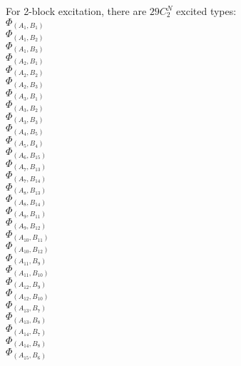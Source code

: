 \documentclass[14pt]{article}
\begin{document}
    For 2-block excitation, there are $ 29C^N_2 $ excited types: \\ 
    $\Phi_{({A}_{1}, {B}_{1})}$ \\ 
    $\Phi_{({A}_{1}, {B}_{2})}$ \\ 
    $\Phi_{({A}_{1}, {B}_{3})}$ \\ 
    $\Phi_{({A}_{2}, {B}_{1})}$ \\ 
    $\Phi_{({A}_{2}, {B}_{2})}$ \\ 
    $\Phi_{({A}_{2}, {B}_{3})}$ \\ 
    $\Phi_{({A}_{3}, {B}_{1})}$ \\ 
    $\Phi_{({A}_{3}, {B}_{2})}$ \\ 
    $\Phi_{({A}_{3}, {B}_{3})}$ \\ 
    $\Phi_{({A}_{4}, {B}_{5})}$ \\ 
    $\Phi_{({A}_{5}, {B}_{4})}$ \\ 
    $\Phi_{({A}_{6}, {B}_{15})}$ \\ 
    $\Phi_{({A}_{7}, {B}_{13})}$ \\ 
    $\Phi_{({A}_{7}, {B}_{14})}$ \\ 
    $\Phi_{({A}_{8}, {B}_{13})}$ \\ 
    $\Phi_{({A}_{8}, {B}_{14})}$ \\ 
    $\Phi_{({A}_{9}, {B}_{11})}$ \\ 
    $\Phi_{({A}_{9}, {B}_{12})}$ \\ 
    $\Phi_{({A}_{10}, {B}_{11})}$ \\ 
    $\Phi_{({A}_{10}, {B}_{12})}$ \\ 
    $\Phi_{({A}_{11}, {B}_{9})}$ \\ 
    $\Phi_{({A}_{11}, {B}_{10})}$ \\ 
    $\Phi_{({A}_{12}, {B}_{9})}$ \\ 
    $\Phi_{({A}_{12}, {B}_{10})}$ \\ 
    $\Phi_{({A}_{13}, {B}_{7})}$ \\ 
    $\Phi_{({A}_{13}, {B}_{8})}$ \\ 
    $\Phi_{({A}_{14}, {B}_{7})}$ \\ 
    $\Phi_{({A}_{14}, {B}_{8})}$ \\ 
    $\Phi_{({A}_{15}, {B}_{6})}$ \\ 
    
\end{document}
